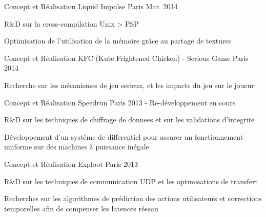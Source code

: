

\begin{cventries}

  \cventry
    {Concept et Réalisation} %
    {Liquid Impulse} %
    {Paris} %
    {Mar. 2014} %
    {
      \begin{cvitems} %
        \item {R\&D sur la cross-compilation Unix > PSP}
        \item {Optimisation de l'utilisation de la mémoire grâce au partage de textures}
      \end{cvitems}
    }

  \cventry
    {Concept et Réalisation} %
    {KFC (Kute Frightened Chicken) - Serious Game} %
    {Paris} %
    {2014} %
    {
      \begin{cvitems} %
        \item {Recherche sur les mécanismes de jeu serieux, et les impacts du jeu sur le joueur}
      \end{cvitems}
    }

  \cventry
    {Concept et Réalisation} %
    {Speedrun} %
    {Paris} %
    {2013 - Re-développement en cours} %
    {
      \begin{cvitems} %
        \item {R\&D sur les techniques de chiffrage de donnees et sur les validations d'integrite}
        \item {Développement d'un système de differentiel pour assurer un fonctionnement uniforme sur des machines à puissance inégale}
      \end{cvitems}
    }

  \cventry
    {Concept et Réalisation} %
    {Exploot} %
    {Paris} %
    {2013} %
    {
      \begin{cvitems} %
        \item {R\&D sur les techniques de communication UDP et les optimisations de transfert}
        \item {Recherches sur les algorithmes de prédiction des actions utilisateurs et corrections temporelles afin de compenser les latences réseau}
      \end{cvitems}
    }


\end{cventries}
